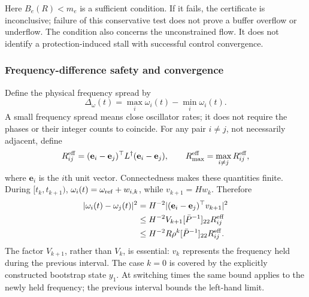 Here $B_e(R)<m_e$ is a sufficient condition. If it fails, the certificate
is inconclusive; failure of this conservative test does not prove a
buffer overflow or underflow. The condition also concerns the
unconstrained flow. It does not identify a protection-induced stall
with successful control convergence.

\subsubsection{Frequency-difference safety and convergence}
Define the physical frequency spread by
\begin{equation}
 \Delta_\omega(t)=\max_i\omega_i(t)-\min_i\omega_i(t).
 \label{detail:eq:btd_frequency_spread}
\end{equation}
A small frequency spread means close oscillator rates; it does not
require the phases or their integer counts to coincide. For any pair
$i\ne j$, not necessarily adjacent, define
\begin{equation}
 R_{ij}^{\rm eff}=(\mathbf e_i-\mathbf e_j)^\top L^\dagger
                     (\mathbf e_i-\mathbf e_j),
 \qquad R_{\max}^{\rm eff}=\max_{i\ne j}R_{ij}^{\rm eff},
 \label{detail:eq:btd_pair_resistance}
\end{equation}
where $\mathbf e_i$ is the $i$th unit vector. Connectedness makes these
quantities finite. During $[t_k,t_{k+1})$, $\omega_i(t)=
\omega_{\rm ref}+w_{i,k}$, while $v_{k+1}=Hw_k$. Therefore
\begin{align}
 |\omega_i(t)-\omega_j(t)|^2
 &=H^{-2}|(\mathbf e_i-\mathbf e_j)^\top v_{k+1}|^2\nonumber\\
 &\le H^{-2}V_{k+1}[\bar P^{-1}]_{22}R_{ij}^{\rm eff}\nonumber\\
 &\le H^{-2}R\rho^k[\bar P^{-1}]_{22}R_{ij}^{\rm eff}.
 \label{detail:eq:btd_pair_frequency_bound}
\end{align}
The factor $V_{k+1}$, rather than $V_k$, is essential: $v_k$ represents
the frequency held during the previous interval. The case $k=0$ is
covered by the explicitly constructed bootstrap state $y_1$.
At switching times the same bound applies to the newly held frequency;
the previous interval bounds the left-hand limit.

